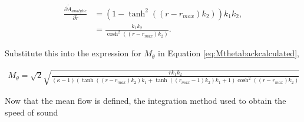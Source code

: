 \begin{align*}
    \frac{\partial \widetilde{A}_{analytic} }{\partial \widetilde{r}} &=
    \left(1 - \tanh^{2}{\left(\left(r - r_{max}\right) {k}_{2} \right)}\right) {k}_{1} {k}_{2}, \\ 
    &= \frac{ k_{1} k_{2}}{\cosh^{2}{\left(\left(r - r_{max}\right) {k}_{2} \right)}}.
\end{align*}

Substitute this into the expression for $M_{\theta}$ in Equation 
\ref{eq:Mthetabackcalculated},

\begin{align*}
    M_{\theta} = \sqrt{2}
    \sqrt{\frac{r {k}_{1} {k}_{2}}{\left(\kappa - 1\right) \left(\tanh{\left(\left(r - r_{max}\right) {k}_{2} \right)} {k}_{1} + \tanh{\left(\left(r_{max} - 1\right) {k}_{2} \right)} {k}_{1} + 1\right) \cosh^{2}{\left(\left(r - r_{max}\right) {k}_{2} \right)}}}
\end{align*} 

Now that the mean flow is defined, the integration method used to obtain the 
speed of sound







